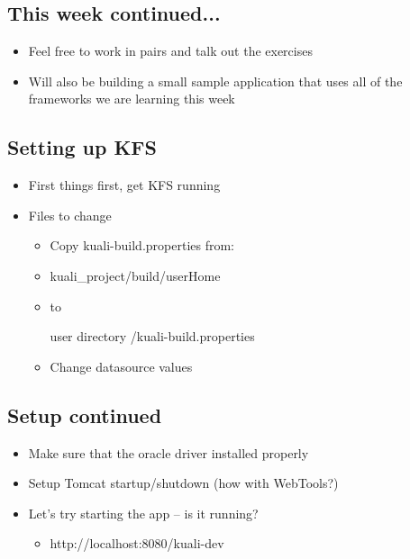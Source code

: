 \documentclass[12pt,notitlepage]{article}
\begin{document}
    \W \begin{s5slide}
        \W \section{This week continued...}
        \begin{ifhtml}
            \begin{itemize}
                \item Feel free to work in pairs and talk out the exercises
                \item Will also be building a small sample application that uses all of the frameworks we are learning this week
            \end{itemize}
        \end{ifhtml} 
    \W \end{s5slide}
    \W \begin{s5slide}
        \W \section{Setting up KFS}
        \begin{ifhtml}
            \begin{itemize}
                \item First things first, get KFS running
                \item Files to change
                \begin{itemize}
                    \item Copy kuali-build.properties from: 
                    \item kuali_project/build/userHome  
                    \item to 
                    \item [user directory]/kuali-build.properties
                    \item Change datasource values
                \end{itemize}
            \end{itemize}
        \end{ifhtml} 
    \W \end{s5slide}
    \W \begin{s5slide}
        \W \section{Setup continued}
        \begin{ifhtml}
            \begin{itemize}
                \item Make sure that the oracle driver installed properly
                \item Setup Tomcat startup/shutdown (how with WebTools?)
                \item Let’s try starting the app – is it running?
                \begin{itemize}
                    \item http://localhost:8080/kuali-dev
                \end{itemize}
            \end{itemize}
        \end{ifhtml} 
    \W \end{s5slide}
\end{document}
